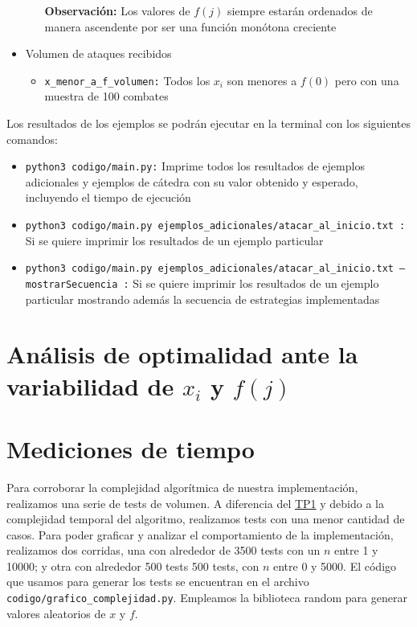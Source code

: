 \documentclass{article}
\begin{document}
\begin{itemize}
\begin{itemize}
        \textbf{Observación: }Los valores de $f(j)$ siempre estarán ordenados de manera ascendente por ser una función monótona creciente
    \end{itemize}
    \item Volumen de ataques recibidos
    \begin{itemize}
        \item \texttt{x\_menor\_a\_f\_volumen:} Todos los $x_i$ son menores a $f(0)$ pero con una muestra de 100 combates
    \end{itemize}
\end{itemize}

Los resultados de los ejemplos se podrán ejecutar en la terminal con los siguientes comandos:

\begin{itemize}
    \item \texttt{python3 codigo/main.py:} Imprime todos los resultados de ejemplos adicionales y ejemplos de cátedra con su valor obtenido y esperado, incluyendo el tiempo de ejecución
    \item \texttt{python3 codigo/main.py ejemplos\_adicionales/atacar\_al\_inicio.txt :} Si se quiere imprimir los resultados de un ejemplo particular
    \item \texttt{python3 codigo/main.py ejemplos\_adicionales/atacar\_al\_inicio.txt --mostrarSecuencia :} Si se quiere imprimir los resultados de un ejemplo particular mostrando además la secuencia de estrategias implementadas
\end{itemize}

\section{Análisis de optimalidad ante la variabilidad de $x_i$ y $f(j)$}

\section{Mediciones de tiempo}
\label{sec:medTiempo}
Para corroborar la complejidad algorítmica de nuestra implementación, realizamos una serie de tests de volumen. A diferencia del \href{https://github.com/La-sociedad-del-silencio/TP1-Greedy}{TP1} y debido a la complejidad temporal del algoritmo, realizamos tests con una menor cantidad de casos.
Para poder graficar y analizar el comportamiento de la implementación, realizamos dos corridas, una con alrededor de 3500 tests con un $n$ entre  1 y 10000; y otra con alrededor 500 tests 500 tests, con $n$ entre 0 y 5000. El código que usamos para generar los tests se encuentran en el archivo \texttt{codigo/grafico\_complejidad.py}. Empleamos la biblioteca random para generar valores aleatorios de $x$ y $f$.
\end{document}

